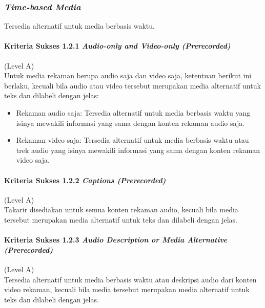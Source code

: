 \documentclass[a4paper,twoside]{article}
\begin{document}
\begin{enumerate}
		\subsubsection*{\textit{Time-based Media}}
		\label{sec:time_based_media}
		Tersedia alternatif untuk media berbasis waktu.

		\paragraph{Kriteria Sukses 1.2.1 \textit{Audio-only and Video-only (Prerecorded)}}
		\label{sec:kriteria_sukses_1.2.1}
		(Level A)\\

		Untuk media rekaman berupa audio saja dan video saja, ketentuan berikut ini berlaku, kecuali bila audio atau video tersebut merupakan media alternatif untuk teks dan dilabeli dengan jelas:
		\begin{itemize}
			\item Rekaman audio saja: Tersedia alternatif untuk media berbasis waktu yang isinya mewakili informasi yang sama dengan konten rekaman audio saja.
			\item Rekaman video saja: Tersedia alternatif untuk media berbasis waktu atau trek audio yang isinya mewakili informasi yang sama dengan konten rekaman video saja.
		\end{itemize}

		\paragraph{Kriteria Sukses 1.2.2 \textit{Captions (Prerecorded)}}
		\label{sec:kriteria_sukses_1.2.2}
		(Level A)\\

		Takarir disediakan untuk semua konten rekaman audio, kecuali bila media tersebut merupakan media alternatif untuk teks dan dilabeli dengan jelas.

		\paragraph{Kriteria Sukses 1.2.3 \textit{Audio Description or Media Alternative (Prerecorded)}}
		\label{sec:kriteria_sukses_1.2.3}
		(Level A)\\

		Tersedia alternatif untuk media berbasis waktu atau deskripsi audio dari konten video rekaman, kecuali bila media tersebut merupakan media alternatif untuk teks dan dilabeli dengan jelas.


\end{enumerate}
\end{document}
